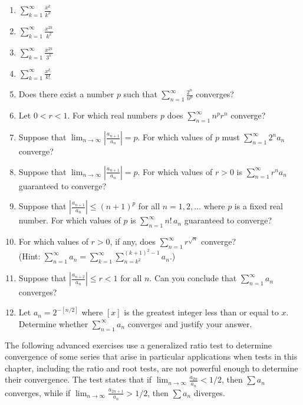 \documentclass{exercises}
\begin{document}
\begin{enumerate}[resume]
\item $\sum_{k=1}^{\infty}\frac{x^{k}}{k^{2}}$
\item $\sum_{k=1}^{\infty}\frac{x^{2k}}{k^{2}}$
\item $\sum_{k=1}^{\infty}\frac{x^{2k}}{3^{k}}$
\item $\sum_{k=1}^{\infty}\frac{x^{k}}{k!}$
\item Does there exist a number $p$ such that $\sum_{n=1}^{\infty}\frac{2^{n}}{n^{p}}$ converges?
\item Let $0<r<1$. For which real numbers $p$ does $\sum_{n=1}^{\infty}n^{p}r^{n}$ converge?
\item Suppose that $\lim_{n\to \infty}|\frac{a_{n+1}}{a_{n}}|=p$. For which values of $p$ must $\sum_{n=1}^{\infty}2^{n}a_{n}$ converge?
\item Suppose that $\lim_{n\to \infty}|\frac{a_{n+1}}{a_{n}}|=p$. For which values of $r>0$ is $\sum_{n=1}^{\infty}r^{n}a_{n}$ guaranteed to converge?
\item Suppose that $|\frac{a_{n+1}}{a_{n}}|\le{(n+1)}^{p}$ for all $n=1,2,\ldots$ where $p$ is a fixed real number. For which values of $p$ is $\sum_{n=1}^{\infty}n!\,a_{n}$ guaranteed to converge?
\item For which values of $r>0$, if any, does $\sum_{n=1}^{\infty}r^{\sqrt{n}}$ converge?\\
  (Hint: $\sum_{n=1}^{\infty}a_{n}=\sum_{k=1}^{\infty}\sum_{n=k^{2}}^{(k+1)^{2}-1}a_{n}$.)
\item Suppose that $|\frac{a_{n+2}}{a_{n}}|\le r<1$ for all $n$. Can you conclude that $\sum_{n=1}^{\infty}a_{n}$ converges?
\item Let $a_{n}=2^{-[n/2]}$ where $[x]$ is the greatest integer less than or equal to $x$. Determine whether $\sum_{n=1}^{\infty}a_{n}$ converges and justify your answer.
\end{enumerate}

The following advanced exercises use a generalized ratio test to determine convergence of some series that arise in particular applications when tests in this chapter, including the ratio and root tests, are not powerful enough to determine their convergence. The test states that if $\lim_{n\to \infty}\frac{a_{2n}}{a_{n}}<1/2$, then $\sum a_{n}$ converges, while if $\lim_{n\to \infty}\frac{a_{2n+1}}{a_{n}}>1/2$, then $\sum a_{n}$ diverges.
\end{document}
